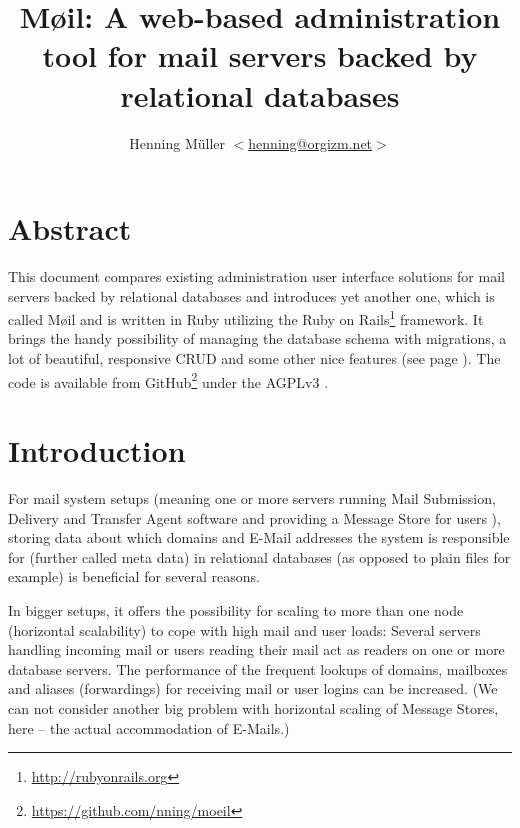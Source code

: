 \documentclass[12pt,a4paper]{scrartcl}
\begin{document}
	\title{Møil: A web-based administration tool for mail servers backed by relational databases}
	\author{Henning Müller $<$\href{mailto:henning@orgizm.net}{henning@orgizm.net}$>$}
	\date{}

	\maketitle


	\section*{Abstract}
		This document compares existing administration user interface solutions
		for mail servers backed by relational databases and introduces yet
		another one, which is called Møil and is written in Ruby utilizing the
		Ruby on Rails\footnote{\url{http://rubyonrails.org}} framework. It
		brings the handy possibility of managing the database schema with
		migrations, a lot of beautiful, responsive CRUD and some other nice
		features (see page \pageref{moeil-features}). The code is available from
		GitHub\footnote{\url{https://github.com/nning/moeil}} under the AGPLv3
		\cite{agpl}.

	\section*{Introduction}
		For mail system setups (meaning one or more servers running Mail
		Submission, Delivery and Transfer Agent software and providing a
		Message Store for users \cite{mail-architecture}), storing data about
		which domains and E-Mail addresses the system is responsible for
		(further called meta data) in relational databases (as opposed to plain
		files for example) is beneficial for several reasons.


		In bigger setups, it offers the possibility for scaling to more than
		one node (horizontal scalability) to cope with high mail and user
		loads: Several servers handling incoming mail or users reading their
		mail act as readers on one or more database servers. The performance of
		the frequent lookups of domains, mailboxes and aliases (forwardings)
		for receiving mail or user logins can be increased. (We can not
		consider another big problem with horizontal scaling of Message Stores,
		here -- the actual accommodation of E-Mails.)

\end{document}
